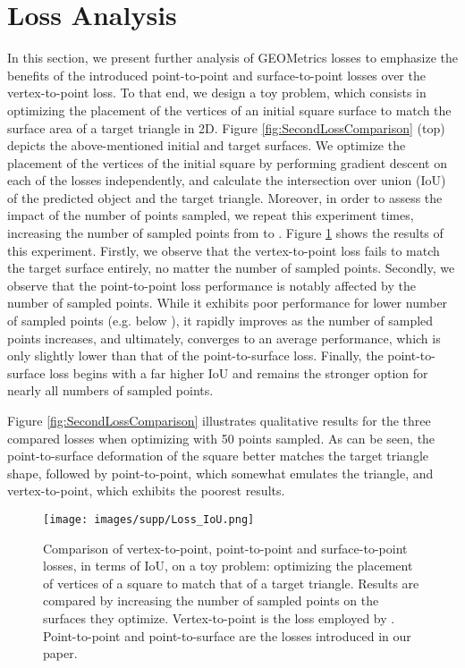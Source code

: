 \documentclass{article}
\begin{document}
\section{Loss Analysis}
In this section, we present further analysis of GEOMetrics losses to emphasize the benefits of the introduced point-to-point and surface-to-point losses over the vertex-to-point loss. To that end, we design a toy problem, which consists in optimizing the placement of the vertices of an initial square surface to match the surface area of a target triangle in 2D. Figure \ref{fig:SecondLossComparison} (top) depicts the above-mentioned initial and target surfaces. We optimize the placement of the vertices of the initial square by performing gradient descent on each of the losses independently, and calculate the intersection over union (IoU) of the predicted object and the target triangle. Moreover, in order to assess the impact of the number of points sampled, we repeat this experiment  times, increasing the number of sampled points from  to . Figure \ref{fig:Loss_graph} shows the results of this experiment. Firstly, we observe that the vertex-to-point loss fails to match the target surface entirely, no matter the number of sampled points. Secondly, we observe that the point-to-point loss performance is notably affected by the number of sampled points. While it exhibits poor performance for lower number of sampled points (e.g. below ), it rapidly improves as the number of sampled points increases, and ultimately, converges to an average performance, which is only slightly lower than that of the point-to-surface loss. Finally, the point-to-surface loss begins with a far higher IoU and remains the stronger option for nearly all numbers of sampled points.

Figure \ref{fig:SecondLossComparison} illustrates qualitative results for the three compared losses when optimizing with 50 points sampled. As can be seen, the point-to-surface deformation of the square better matches the target triangle shape, followed by point-to-point, which somewhat emulates the triangle, and vertex-to-point, which exhibits the poorest results.

\vspace{-2mm}
\begin{figure}[h!]
\centering
\texttt{[image: images/supp/Loss\_IoU.png]}
\vspace{-2mm}
\caption{Comparison of vertex-to-point, point-to-point and surface-to-point losses, in terms of IoU, on a toy problem: optimizing the placement of vertices of a square to match that of a target triangle. Results are compared by increasing the number of sampled points on the surfaces they optimize. Vertex-to-point is the loss employed by \citet{Pixel2Mesh}. Point-to-point and point-to-surface are the losses introduced in our paper. } \label{fig:Loss_graph}
\end{figure}
\end{document}
